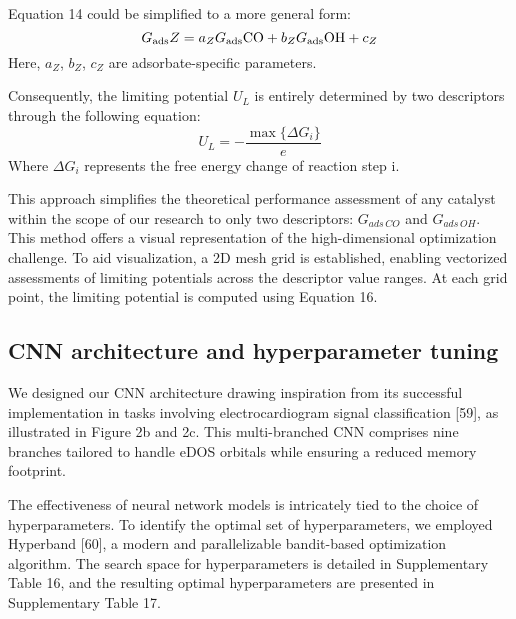 Equation 14 could be simplified to a more general form:
\begin{equation*}
G_{\text{ads}} Z = a_Z G_{\text{ads}} \ce{CO} + b_Z G_{\text{ads}} \ce{OH} + c_Z
\end{equation*}
Here, $a_Z$, $b_Z$, $c_Z$ are adsorbate-specific parameters.

Consequently, the limiting potential $\textit{U}_{L}$ is entirely determined by two descriptors through the following equation:
\begin{equation*}
U_L = -\frac{\max\{ \Delta G_i \}}{e}
\end{equation*}
Where $\Delta G_{i}$ represents the free energy change of reaction step i.

This approach simplifies the theoretical performance assessment of any catalyst within the scope of our research to only two descriptors: $G_{\textit{ads} \, \textit{CO}}$ and $G_{\textit{ads} \, \textit{OH}}$.
This method offers a visual representation of the high-dimensional optimization challenge.
To aid visualization, a 2D mesh grid is established, enabling vectorized assessments of limiting potentials across the descriptor value ranges.
At each grid point, the limiting potential is computed using Equation 16.


\subsection{CNN architecture and hyperparameter tuning}
We designed our CNN architecture drawing inspiration from its successful implementation in tasks involving electrocardiogram signal classification [59], as illustrated in Figure 2b and 2c.
This multi-branched CNN comprises nine branches tailored to handle eDOS orbitals while ensuring a reduced memory footprint.

The effectiveness of neural network models is intricately tied to the choice of hyperparameters.
To identify the optimal set of hyperparameters, we employed Hyperband [60], a modern and parallelizable bandit-based optimization algorithm.
The search space for hyperparameters is detailed in Supplementary Table 16, and the resulting optimal hyperparameters are presented in Supplementary Table 17.


